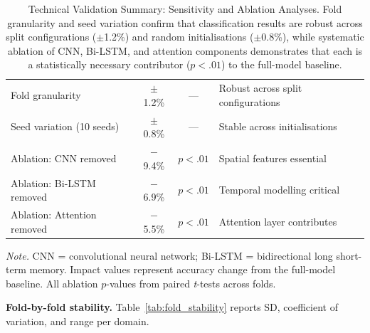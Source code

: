 \begin{table}[!htbp]
\tablestripes\tablefontsize
\caption[Technical Validation Summary: Sensitivity and Ablation]{Technical Validation Summary: Sensitivity and Ablation Analyses. Fold granularity and seed variation confirm that classification results are robust across split configurations ($\pm$1.2\%) and random initialisations ($\pm$0.8\%), while systematic ablation of CNN, Bi-LSTM, and attention components demonstrates that each is a statistically necessary contributor ($p < .01$) to the full-model baseline.}
\tablefontsize
\begin{tabularx}{\textwidth}{@{} L C C L @{}}
\toprule
{} &  &  &  \\
\midrule
Fold granularity & $\pm$1.2\% & --- & Robust across split configurations \\
Seed variation (10 seeds) & $\pm$0.8\% & --- & Stable across initialisations \\
\addlinespace
Ablation: CNN removed & $-$9.4\% & $p < .01$ & Spatial features essential \\
Ablation: Bi-LSTM removed & $-$6.9\% & $p < .01$ & Temporal modelling critical \\
Ablation: Attention removed & $-$5.5\% & $p < .01$ & Attention layer contributes \\
\bottomrule
\end{tabularx}
\vspace{0.5em}\noindent\textit{Note.} CNN = convolutional neural network; Bi-LSTM = bidirectional long short-term memory. Impact values represent accuracy change from the full-model baseline. All ablation $p$-values from paired \textit{t}-tests across folds.
\end{table}

\textbf{Fold-by-fold stability.} Table~\ref{tab:fold_stability} reports SD, coefficient of variation, and range per domain.

\iffalse %

